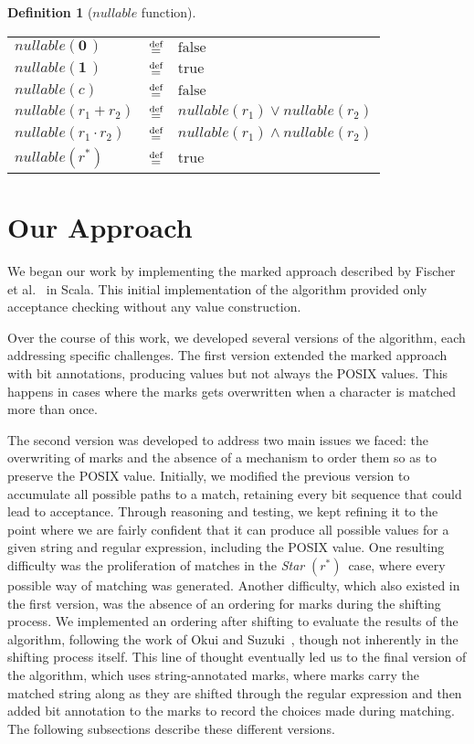 \documentclass[12pt]{article}
\newtheorem{definition}{Definition} %
\newcommand{\dn}{\ensuremath{\stackrel{\mbox{\scriptsize def}}{=}}}
\newcommand{\ZERO}{\textbf{0}}
\newcommand{\ONE}{\textbf{1}}
\newcommand{\nullable}{\textit{nullable}}
\newcommand{\STARText}{\textit{Star} $(r^*)$}
\begin{document}
\begin{definition}[$\nullable$ function]\mbox{}

  \renewcommand{\arraystretch}{1.5}
  \begin{tabular}{lcl}
    $\nullable(\ZERO\,)$         & \dn & $\text{false}$ \\
    $\nullable(\ONE\,)$          & \dn & $\text{true}$ \\
    $\nullable(c)$               & \dn & $\text{false}$ \\
    $\nullable(r_1 + r_2)$       & \dn & $\nullable(r_1) \lor \nullable(r_2)$ \\ 
    $\nullable(r_1 \cdot r_2)$   & \dn & $\nullable(r_1) \land \nullable(r_2)$ \\
    $\nullable(r^*)$             & \dn & $\text{true}$
  \end{tabular}
  \renewcommand{\arraystretch}{1.0}
\end{definition}

\FloatBarrier
\section{Our Approach}
We began our work by implementing the marked approach described by Fischer et al.~\cite{Fischer2010} in Scala. 
This initial implementation of the algorithm provided only acceptance checking without any value construction.  

Over the course of this work, we developed several versions of the algorithm, each addressing specific challenges.  
The first version extended the marked approach with bit annotations, producing values but not always the POSIX values. 
This happens in cases where the marks gets overwritten when a character is matched more than once.

The second version was developed to address two main issues we faced: the overwriting of marks and the absence of a mechanism to order them 
so as to preserve the POSIX value. Initially, we modified the previous version to accumulate all possible paths to a match, retaining 
every bit sequence that could lead to acceptance. Through reasoning and testing, we kept refining it to the point where we are fairly confident 
that it can produce all possible values for a given string and regular expression, including the POSIX value.  
One resulting difficulty was the proliferation of matches in the \STARText\ case, where every possible way of matching was generated.  
Another difficulty, which also existed in the first version, was the absence of an ordering for marks during the shifting process.  
We implemented an ordering after shifting to evaluate the results of the algorithm, following the work of Okui and Suzuki~\cite{OkuiSuzuki2013}, 
though not inherently in the shifting process itself. This line of thought eventually led us to the final version of the algorithm, which uses 
string-annotated marks, where marks carry the matched string along as they are shifted through the regular expression and then added bit annotation to the marks
to record the choices made during matching.
The following subsections describe these different versions.
\end{document}
